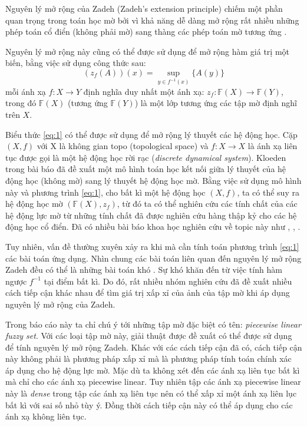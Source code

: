\documentclass[../report.tex]{subfiles}
\begin{document}
Nguyên lý mở rộng của Zadeh (Zadeh's extension principle) chiếm một phần 
quan trọng trong toán học mờ bởi vì khả năng dễ dàng mở rộng rất nhiều những 
phép toán cổ điển (không phải mờ) sang thàng các phép toán mờ tương ứng \cite{Zadeh-extension}.

Nguyên lý mở rộng này cũng có thể được sử dụng để mở rộng hàm giá trị một biến,
bằng việc sử dụng công thức sau:
\begin{equation}
(z_f(A))(x) = \sup_{y \in f^{-1}(x)} \{ A(y) \}
\label{eq:1}
\end{equation}
mỗi ánh xạ $f: X \rightarrow Y$ định nghĩa duy nhất một ánh xạ:
$z_f: \mathbb{F}(X) \rightarrow \mathbb{F}(Y)$, trong đó $\mathbb{F}(X)$
(tương ứng $\mathbb{F}(Y)$) là một lớp tương ứng các tập mờ 
định nghĩ trên $X$.

Biểu thức \eqref{eq:1} có thể được sử dụng để mở rộng
lý thuyết các hệ động học. Cặp $(X, f)$ với X là không gian topo (topological space) 
và $f: X \rightarrow X$ là ánh xạ liên tục được gọi là một hệ động học rời rạc
(\textit{discrete dynamical system}).
Kloeden trong bài báo \cite{Kloeden} đã đề xuất một mô hình toán học 
kết nối giữa lý thuyết của hệ động học (không mờ) sang lý thuyết hệ động học mờ. 
Bằng việc sử dụng mô hình này và phương trình \eqref{eq:1}, cho bất kì một hệ động
học $(X, f)$, ta có thể suy ra hệ động học mờ $(\mathbb{F}(X), z_f)$, từ đó ta 
có thể nghiên cứu các tính chất của các hệ động lực mờ từ những tính chất đã được 
nghiên cứu hàng thập kỷ cho các hệ động học cổ điển. Đã có nhiều bài báo khoa học
nghiên cứu về topic này như \cite{topological-entropy}, \cite{diffusion-equation},
\cite{Kloeden} \cite{Kupka}.

Tuy nhiên, vấn đề thường xuyên xảy ra khi mà cần tính toán phương trình \eqref{eq:1}
các bài toán ứng dụng. Nhìn chung các bài toán liên quan đến nguyên lý mở rộng 
Zadeh đều có thể là những bài toán khó \cite{Zadeh-extension}.
Sự khó khăn đến từ việc tính hàm ngược $f^{-1}$
tại điểm bất kì. Do đó, rất nhiều nhóm nghiên cứu đã đề xuất nhiều cách tiếp cận 
khác nhau để tìm giá trị xấp xỉ của ảnh của tập mờ khi áp dụng nguyên lý mở rộng của Zadeh.

Trong báo cáo này ta chỉ chú ý tới những tập mờ đặc biệt có tên:
\textit{piecewise linear fuzzy set}.
Với các loại tập mờ này, giải thuật được đề xuất có thể được sử dụng để tính 
nguyên lý mở rộng Zadeh. Khác với các cách tiếp cận đã có, cách tiếp cận này 
không phải là phương pháp xấp xỉ mà là phương pháp tính toán chính xác áp dụng 
cho hệ động lực mờ.  
Mặc dù ta không xét đến các ánh xạ liên tục bất kì mà chỉ cho các ánh xạ
piecewise linear. Tuy nhiên tập các ánh xạ piecewise linear này là
\textit{dense} trong tập các ánh xạ liên tục nên có thể xấp xỉ một 
ánh xạ liên lục bất kì với sai số nhỏ tùy ý.
Đồng thời cách tiếp cận này có thể áp dụng cho các ánh xạ không liên tục.
\end{document}
